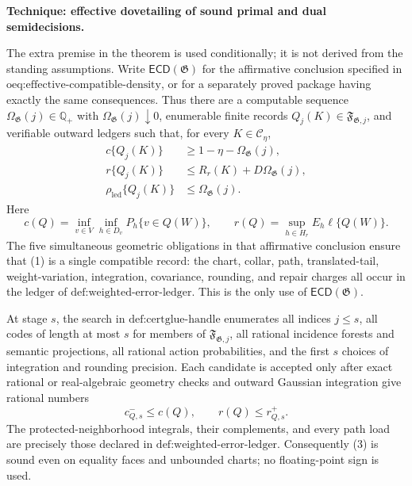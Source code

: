\textbf{Technique: effective dovetailing of sound primal and dual semidecisions.}

The extra premise in the theorem is used conditionally; it is not derived from the standing assumptions.  Write \(\mathsf{ECD}(\mathfrak G)\) for the affirmative conclusion specified in \(\text{oeq:effective-compatible-density}\), or for a separately proved package having exactly the same consequences.  Thus there are a computable sequence \(\Omega_{\mathfrak G}(j)\in\mathbb Q_+\) with \(\Omega_{\mathfrak G}(j)\downarrow0\), enumerable finite records \(Q_j(K)\in\mathfrak F_{\mathfrak G,j}\), and verifiable outward ledgers such that, for every \(K\in\mathcal C_\eta\),
\[
 \begin{split}
 c\{Q_j(K)\}&\ge 1-\eta-\Omega_{\mathfrak G}(j),\\
 r\{Q_j(K)\}&\le R_r(K)+D\Omega_{\mathfrak G}(j),\\
 \rho_{\mathrm{led}}\{Q_j(K)\}&\le \Omega_{\mathfrak G}(j).
 \end{split}
 \tag{1}
\]
Here
\[
 c(Q)=\inf_{v\in V}\inf_{h\in D_v}P_h\{v\in Q(W)\},
 \qquad
 r(Q)=\sup_{h\in H_r}E_h\ell\{Q(W)\}.
 \tag{2}
\]
The five simultaneous geometric obligations in that affirmative conclusion ensure that (1) is a single compatible record: the chart, collar, path, translated-tail, weight-variation, integration, covariance, rounding, and repair charges all occur in the ledger of \(\text{def:weighted-error-ledger}\).  This is the only use of \(\mathsf{ECD}(\mathfrak G)\).

At stage \(s\), the search in \(\text{def:certglue-handle}\) enumerates all indices \(j\le s\), all codes of length at most \(s\) for members of \(\mathfrak F_{\mathfrak G,j}\), all rational incidence forests and semantic projections, all rational action probabilities, and the first \(s\) choices of integration and rounding precision.  Each candidate is accepted only after exact rational or real-algebraic geometry checks and outward Gaussian integration give rational numbers
\[
 c^-_{Q,s}\le c(Q),
 \qquad
 r(Q)\le r^+_{Q,s}.
 \tag{3}
\]
The protected-neighborhood integrals, their complements, and every path load are precisely those declared in \(\text{def:weighted-error-ledger}\).  Consequently (3) is sound even on equality faces and unbounded charts; no floating-point sign is used.

